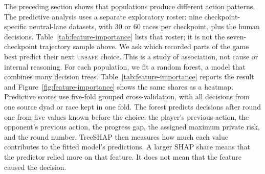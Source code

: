 \documentclass{article}
\newcommand{\Unsafe}{\textsc{unsafe}}
\begin{document}
The preceding section shows that populations produce different action
patterns. The predictive analysis uses a separate exploratory roster: nine
checkpoint-specific neutral-lane datasets, with 30 or 60 races per checkpoint,
plus the human decisions. Table~\ref{tab:feature-importance} lists that roster;
it is not the seven-checkpoint trajectory sample above. We ask which recorded
parts of the game best predict their next
\Unsafe{} choice. This is a study of association, not cause or internal
reasoning. For each population, we fit a random forest, a model that combines
many decision trees. Table~\ref{tab:feature-importance} reports the result
and Figure~\ref{fig:feature-importance} shows the same shares as a heatmap.
Predictive scores use five-fold grouped cross-validation,
with all decisions from one source dyad or race kept in one fold. The forest
predicts decisions after round one from five values
known before the choice: the player's previous action, the opponent's previous
action, the progress gap, the assigned maximum private risk, and the round
number. TreeSHAP then measures how much each value contributes to the fitted
model's predictions. A larger SHAP share means that the predictor relied more
on that feature. It does not mean that the feature caused the decision.
\end{document}
